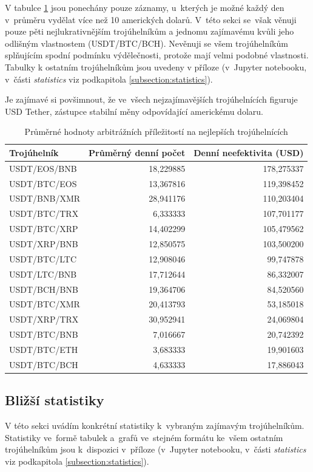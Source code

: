 \documentclass[thesis=B,czech]{FITthesis}[2019/03/21]
\begin{document}
V tabulce \ref{table_combined_best} jsou ponechány pouze záznamy, u~kterých je možné každý den v~průměru vydělat více než 10 amerických dolarů. V~této sekci se~však věnuji pouze pěti nejlukrativnějším trojúhelníkům a jednomu zajímavému kvůli jeho odlišným vlastnostem (USDT/BTC/BCH). Nevěnuji se všem trojúhelníkům splňujícím spodní podmínku výdělečnosti, protože mají velmi podobné vlastnosti. Tabulky k ostatním trojúhelníkům jsou uvedeny v příloze (v~Jupyter notebooku, v~části \textit{statistics} viz podkapitola \ref{subsection:statistics}).

Je zajímavé si povšimnout, že ve~všech nejzajímavějších trojúhelnících figuruje USD Tether, zástupce stabilní měny odpovídající americkému dolaru.

\begin{table}[h]\centering
\caption{Průměrné hodnoty arbitrážních příležitostí na nejlepších trojúhelnících}
\label{table_combined_best}
\begin{tabular}{|| l | r | r ||}\hline Trojúhelník & Průměrný denní počet & Denní neefektivita (USD)\\
 \hline
 \hline USDT/EOS/BNB & 18,229885 & 178,275337\\ 
 \hline USDT/BTC/EOS & 13,367816 & 119,398452\\ 
 \hline USDT/BNB/XMR & 28,941176 & 110,203404\\ 
 \hline USDT/BTC/TRX & 6,333333 & 107,701177\\ 
 \hline USDT/BTC/XRP & 14,402299 & 105,479562\\ 
 \hline USDT/XRP/BNB & 12,850575 & 103,500200\\ 
 \hline USDT/BTC/LTC & 12,908046 & 99,747878\\ 
 \hline USDT/LTC/BNB & 17,712644 & 86,332007\\ 
 \hline USDT/BCH/BNB & 19,364706 & 84,520560\\ 
 \hline USDT/BTC/XMR & 20,413793 & 53,185018\\ 
 \hline USDT/XRP/TRX & 30,952941 & 24,069804\\ 
 \hline USDT/BTC/BNB & 7,016667 & 20,742392\\ 
 \hline USDT/BTC/ETH & 3,683333 & 19,901603\\ 
 \hline USDT/BTC/BCH & 4,633333 & 17,886043\\ 
 \hline
\end{tabular}
\end{table}

\subsection{Bližší statistiky}
V této sekci uvádím konkrétní statistiky k~vybraným zajímavým trojúhelníkům. Statistiky ve~formě tabulek a~grafů ve~stejném formátu ke~všem ostatním trojúhelníkům jsou k~dispozici v~příloze (v~Jupyter notebooku, v~části \textit{statistics} viz podkapitola \ref{subsection:statistics}).
\end{document}
